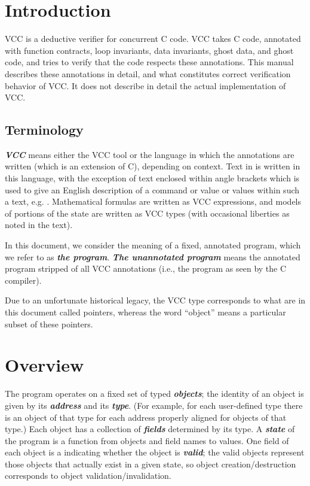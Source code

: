 \documentclass[preprint,nocopyrightspace]{sigplanconf}
\newcommand{\Def}[1]{\textit{\textbf{#1}}}
\begin{document}
\ifdense
\renewcommand{\labelitemi}{{\footnotesize \centeroncapheight{$\bullet$}}}
\fi

\section{Introduction}
VCC is a deductive verifier for concurrent C code. VCC takes C code,
annotated with function contracts, loop invariants, data invariants,
ghost data, and ghost code, and tries to verify that the code respects
these annotations. This manual describes these annotations in detail,
and what constitutes correct verification behavior of VCC. It does not
describe in detail the actual implementation of VCC.

\subsection{Terminology}
\Def{VCC} means either the VCC tool or the language in
which the annotations are written (which is an extension of C),
depending on context.
Text in  is written in this language, with the
exception of text enclosed within angle brackets which is used to
give an English description of a command or value or values within
such a text, e.g. . Mathematical
formulas are written as VCC expressions, and models of portions of the
state are written as VCC types (with occasional liberties as noted in
the text). 

In this document, we consider the meaning of a fixed, annotated
program, which we refer to as \Def{the program}. \Def{The unannotated
program} means the annotated program stripped of all VCC annotations
(i.e., the program as seen by the C compiler).

Due to an unfortunate historical legacy, the VCC type \vcc{\object}
corresponds to what are in this document called pointers, whereas the
word ``object'' means a particular subset of these pointers.

\section{Overview}

The program operates on a fixed set of typed \Def{objects}; the
identity of an object is given by its \Def{address} and
its \Def{type}.  (For example, for each user-defined  type
there is an object of that type for each address properly aligned for
objects of that type.)  Each object has a collection of \Def{fields}
determined by its type.  A \Def{state} of the program is a function
from objects and field names to values. One field of each object is
a  indicating whether the object is \Def{valid}; the
valid objects represent those objects that actually exist in a given
state, so object creation/destruction corresponds to object
validation/invalidation.
\end{document}
